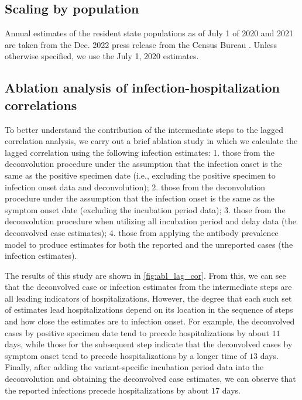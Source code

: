 \subsection{Scaling by population}

Annual estimates of the resident state
populations as of July 1 of 2020 and 2021 are taken from the Dec.
2022 press release from the \US Census Bureau \citep{uscensus2022annual}.
Unless otherwise specified, we use the July 1, 2020 estimates.


\subsection{Ablation analysis of infection-hospitalization correlations}

To better understand the contribution of the intermediate steps to the lagged
correlation analysis, we carry out a brief ablation study in which we calculate
the lagged correlation using the following infection estimates: 1. those from
the deconvolution procedure under the assumption that the infection onset is the
same as the positive specimen date (i.e., excluding the positive specimen to
infection onset data and deconvolution); 2. those from the deconvolution
procedure under the assumption that the infection onset is the same as the
symptom onset date (excluding the incubation period data); 3. those from the
deconvolution procedure when utilizing all incubation period and delay data (the
deconvolved case estimates); 4. those from applying the antibody prevalence
model to produce estimates for both the reported and the unreported cases (the
infection estimates).

The results of this study are shown in \autoref{fig:abl_lag_cor}. From
this, we can see that the deconvolved case or infection estimates from the
intermediate steps are all leading indicators of hospitalizations. However, the
degree that each such set of estimates lead hospitalizations depend on its
location in the sequence of steps and how close the estimates are to infection
onset. For example, the deconvolved cases by positive specimen date tend to
precede hospitalizations by about $11$ days, while those for the subsequent step
indicate that the deconvolved cases by symptom onset tend to precede
hospitalizations by a longer time of $13$ days. Finally, after adding the
variant-specific incubation period data into the deconvolution and obtaining the
deconvolved case estimates, we can observe that the reported infections precede
hospitalizations by about $17$ days. 

